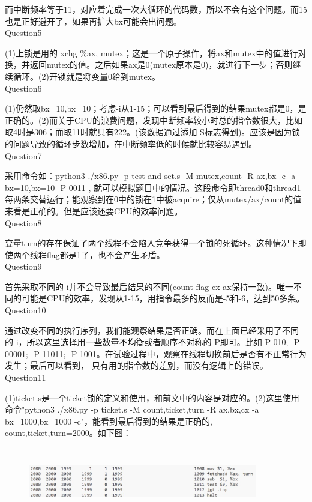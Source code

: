 \documentclass[11pt]{article}
\begin{document}
而中断频率等于11，对应着完成一次大循环的代码数，所以不会有这个问题。而15也是正好避开了，如果再扩大bx可能会出问题。\\
Question5\par
(1)上锁是用的 xchg \%ax, mutex；这是一个原子操作，将ax和mutex中的值进行对换，并返回mutex的值。之后如果ax是0(mutex原本是0)，就进行下一步；否则继续循环。(2)开锁就是将变量0给到mutex。\\
Question6\par
(1)仍然取bx=10,bx=10；考虑-i从1-15；可以看到最后得到的结果mutex都是0，是正确的。(2)而关于CPU的浪费问题，发现中断频率较小时总的指令数很大，比如取4时是306；而取11时就只有222。(该数据通过添加-S标志得到)。应该是因为锁的问题导致的循环步数增加，在中断频率低的时候就比较容易遇到。\\
Question7\par
采用命令如：python3 ./x86.py -p test-and-set.s -M mutex,count -R ax,bx -c -a bx=10,bx=10 -P 0011 , 就可以模拟题目中的情况。这段命令即thread0和thread1每两条交替运行；能观察到在0中的锁在1中被acquire；仅从mutex/ax/count的值来看是正确的。但是应该还要CPU的效率问题。\\
Question8\par
变量turn的存在保证了两个线程不会陷入竞争获得一个锁的死循环。这种情况下即使两个线程flag都是1了，也不会产生矛盾。\\
Question9\par
首先采取不同的-i并不会导致最后结果的不同(count flag cx ax保持一致)。唯一不同的可能是CPU的效率，发现从1-15，用指令最多的反而是-5和-6，达到50多条。\\
Question10\par
通过改变不同的执行序列，我们能观察结果是否正确。而在上面已经采用了不同的-i，所以这里选择用一些数量不均衡或者顺序不对称的-P即可。比如-P 010; -P 00001; -P 11011; -P 1001。在试验过程中，观察在线程切换前后是否有不正常行为发生；最后可以看到，
只有用的指令数的差别，而没有逻辑上的错误。\\
Question11\par
(1)ticket.s是一个ticket锁的定义和使用，和前文中的内容是对应的。(2)这里使用命令"python3 ./x86.py -p ticket.s -M count,ticket,turn -R ax,bx,cx -a bx=1000,bx=1000 -c"，能看到最后得到的结果是正确的, count,ticket,turn=2000。如下图：
\newpage
\begin{figure}[h]
    \centering
    \includegraphics[height=3cm,width=10cm]{hw8-2.jpg}
\end{figure}
\end{document}
